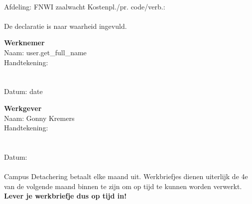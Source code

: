 \documentclass[a4paper,twoside]{article}
\begin{document}
		\paragraph{}
			
			Afdeling: FNWI zaalwacht Kostenpl./pr. code/verb.: 
			
		\paragraph{}
			
			De declaratie is naar waarheid ingevuld.
			
			\begin{multicols}{2}
				\textbf{Werknemer}
				\\
				Naam: {{ user.get_full_name }}
				\\
				Handtekening:
				\\ 
				\\ 
				\\ 
				Datum: {{ date }}
				
			\columnbreak
				\textbf{Werkgever}
				\\
				Naam: Gonny Kremers
				\\
				Handtekening:
				\\ 
				\\ 
				\\
				Datum: 
				
			\end{multicols}
			
		\paragraph{}
			
			Campus Detachering betaalt elke maand uit. Werkbriefjes dienen uiterlijk de 4e van de volgende maand binnen te zijn om op tijd te kunnen worden verwerkt. {\bfseries Lever je werkbriefje dus op tijd in!}
			
\end{document}

